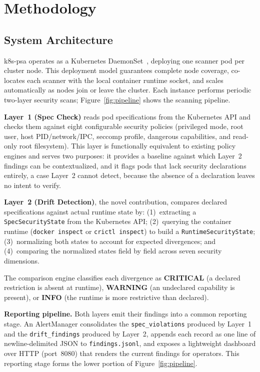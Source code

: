 \documentclass[sigconf]{acmart}
\begin{document}
\section{Methodology}

\subsection{System Architecture}

k8s-psa operates as a Kubernetes DaemonSet~\cite{k8sdaemonset2024}, deploying one scanner pod per cluster node. This deployment model guarantees complete node coverage, co-locates each scanner with the local container runtime socket, and scales automatically as nodes join or leave the cluster. Each instance performs periodic two-layer security scans; Figure~\ref{fig:pipeline} shows the scanning pipeline.

\textbf{Layer~1 (Spec Check)} reads pod specifications from the Kubernetes API and checks them against eight configurable security policies (privileged mode, root user, host PID/network/IPC, seccomp profile, dangerous capabilities, and read-only root filesystem). This layer is functionally equivalent to existing policy engines and serves two purposes: it provides a baseline against which Layer~2 findings can be contextualized, and it flags pods that lack security declarations entirely, a case Layer~2 cannot detect, because the absence of a declaration leaves no intent to verify.

\textbf{Layer~2 (Drift Detection)}, the novel contribution, compares declared specifications against actual runtime state by: (1)~extracting a \texttt{SpecSecurityState} from the Kubernetes API; (2)~querying the container runtime (\texttt{docker inspect} or \texttt{crictl inspect}) to build a \texttt{RuntimeSecurityState}; (3)~normalizing both states to account for expected divergences; and (4)~comparing the normalized states field by field across seven security dimensions.

The comparison engine classifies each divergence as \textbf{CRITICAL} (a declared restriction is absent at runtime), \textbf{WARNING} (an undeclared capability is present), or \textbf{INFO} (the runtime is more restrictive than declared).

\textbf{Reporting pipeline.} Both layers emit their findings into a common reporting stage. An AlertManager consolidates the \texttt{spec\_violations} produced by Layer~1 and the \texttt{drift\_findings} produced by Layer~2, appends each record as one line of newline-delimited JSON to \texttt{findings.jsonl}, and exposes a lightweight dashboard over HTTP (port~8080) that renders the current findings for operators. This reporting stage forms the lower portion of Figure~\ref{fig:pipeline}.
\end{document}
